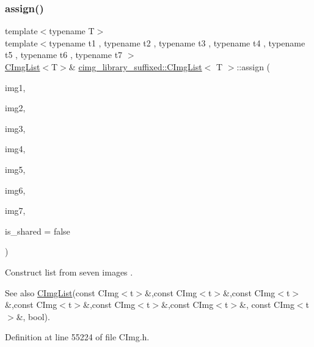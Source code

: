\subsubsection{\texorpdfstring{assign()}{assign()}\hspace{0.1cm}{\footnotesize\ttfamily [14/18]}}
{\footnotesize\ttfamily template$<$typename T$>$ \\
template$<$typename t1 , typename t2 , typename t3 , typename t4 , typename t5 , typename t6 , typename t7 $>$ \\
\hyperlink{structcimg__library__suffixed_1_1CImgList}{C\+Img\+List}$<$T$>$\& \hyperlink{structcimg__library__suffixed_1_1CImgList}{cimg\+\_\+library\+\_\+suffixed\+::\+C\+Img\+List}$<$ T $>$\+::assign (\begin{DoxyParamCaption}\item[{const \hyperlink{structcimg__library__suffixed_1_1CImg}{C\+Img}$<$ t1 $>$ \&}]{img1,  }\item[{const \hyperlink{structcimg__library__suffixed_1_1CImg}{C\+Img}$<$ t2 $>$ \&}]{img2,  }\item[{const \hyperlink{structcimg__library__suffixed_1_1CImg}{C\+Img}$<$ t3 $>$ \&}]{img3,  }\item[{const \hyperlink{structcimg__library__suffixed_1_1CImg}{C\+Img}$<$ t4 $>$ \&}]{img4,  }\item[{const \hyperlink{structcimg__library__suffixed_1_1CImg}{C\+Img}$<$ t5 $>$ \&}]{img5,  }\item[{const \hyperlink{structcimg__library__suffixed_1_1CImg}{C\+Img}$<$ t6 $>$ \&}]{img6,  }\item[{const \hyperlink{structcimg__library__suffixed_1_1CImg}{C\+Img}$<$ t7 $>$ \&}]{img7,  }\item[{const bool}]{is\+\_\+shared = {\ttfamily false} }\end{DoxyParamCaption})\hspace{0.3cm}{\ttfamily [inline]}}



Construct list from seven images . 

\begin{DoxySeeAlso}{See also}
\hyperlink{structcimg__library__suffixed_1_1CImgList}{C\+Img\+List}(const C\+Img$<$t$>$\&,const C\+Img$<$t$>$\&,const C\+Img$<$t$>$\&,const C\+Img$<$t$>$\&,const C\+Img$<$t$>$\&,const C\+Img$<$t$>$\&, const C\+Img$<$t$>$\&, bool). 
\end{DoxySeeAlso}


Definition at line 55224 of file C\+Img.\+h.

